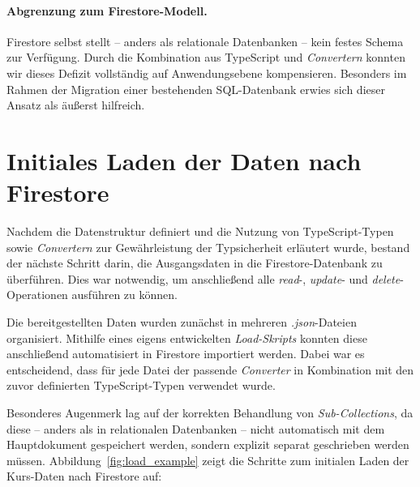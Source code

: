 \documentclass[12pt,a4paper%
              ,oneside     %
              ,titlepage
              ,DIV=13
              ,headinclude
              ,footinclude=false%
              ,cleardoublepage=empty%
              ,parskip=half,
              BCOR=0mm,
              ]{scrreprt}
\begin{document}
\paragraph{\textbf{Abgrenzung zum Firestore-Modell.}} Firestore selbst stellt – anders als relationale Datenbanken – kein festes Schema zur Verfügung. Durch die Kombination aus TypeScript und \textit{Convertern} konnten wir dieses Defizit vollständig auf Anwendungsebene kompensieren. Besonders im Rahmen der Migration einer bestehenden SQL-Datenbank erwies sich dieser Ansatz als äußerst hilfreich.

\section{Initiales Laden der Daten nach Firestore}

Nachdem die Datenstruktur definiert und die Nutzung von TypeScript-Typen sowie \textit{Convertern} zur Gewährleistung der Typsicherheit erläutert wurde, bestand der nächste Schritt darin, die Ausgangsdaten in die Firestore-Datenbank zu überführen. Dies war notwendig, um anschließend alle \textit{read}-, \textit{update}- und \textit{delete}-Operationen ausführen zu können.

Die bereitgestellten Daten wurden zunächst in mehreren \textit{.json}-Dateien organisiert. Mithilfe eines eigens entwickelten \textit{Load-Skripts} konnten diese anschließend automatisiert in Firestore importiert werden. Dabei war es entscheidend, dass für jede Datei der passende \textit{Converter} in Kombination mit den zuvor definierten TypeScript-Typen verwendet wurde.

Besonderes Augenmerk lag auf der korrekten Behandlung von \textit{Sub-Collections}, da diese – anders als in relationalen Datenbanken – nicht automatisch mit dem Hauptdokument gespeichert werden, sondern explizit separat geschrieben werden müssen. Abbildung~\ref{fig:load_example} zeigt die Schritte zum initialen Laden der Kurs-Daten nach Firestore auf:
\end{document}
